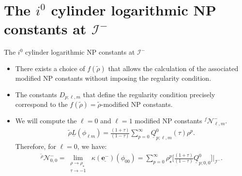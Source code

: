 \documentclass{beamer}
\theoremstyle{remark}
\theoremstyle{plain}
\theoremstyle{plain}
\begin{document}
\section{The $i^0$ cylinder logarithmic NP constants at $\mathscr{I}^{-}$}
\begin{frame}{The $i^0$ cylinder logarithmic NP constants at $\mathscr{I}^{-}$}
  \begin{itemize}
    \item There exists a choice of $f(\tilde{\rho})$ that allows the calculation of the associated modified NP constants without imposing the regularity condition. 
    \item The constants $D_{p;\ell,m}$ that define the regularity condition precisely correspond to the $f(\tilde{\rho}) = \tilde{\rho}$-modified NP constants.
    \item We will compute the $\ell=0$ and $\ell=1$ modified NP constants ${}^{f}\mathcal{N}^{-}_{\ell,m}$.
    \begin{align}
      \tilde{\rho}\underline{L} (\phi_{\ell m}) = \frac{(1+\tau)}{(1-\tau)}\sum_{p=0}^{\infty}\underline{Q}^{0}_{p;\ell,m}(\tau)\rho^p.
    \end{align}
    Therefore, for $\ell=0$, we have:
    \begin{align}
      \mathcal{}^{\tilde{\rho}}\mathcal{N}^{-}_{0,0} = \lim_{\substack{\rho \to \rho_{\star} \\ \tau \to -1}} \; \kappa(\underline{\boldsymbol{e}^{-}})(\phi_{00}) = \sum_{p=0}^{\infty}\rho_{\star}^p\biggl[\frac{(1+\tau)}{(1-\tau)}\underline{Q}^{0}_{p;0,0}\biggr]|_{\mathscr{I}^{-}}.
    \end{align}
  \end{itemize}
\end{frame}
\end{document}
